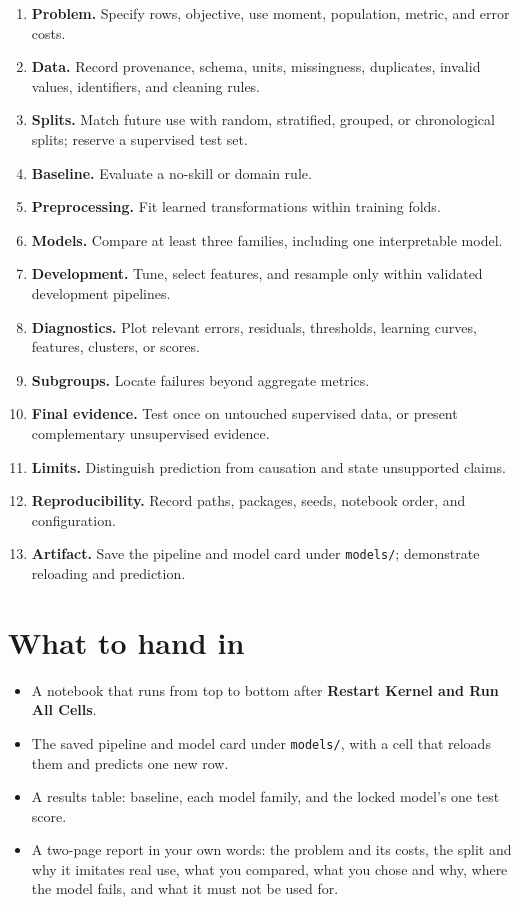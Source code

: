 \begin{enumerate}
  \item \textbf{Problem.} Specify rows, objective, use moment, population, metric, and error costs.
  \item \textbf{Data.} Record provenance, schema, units, missingness, duplicates, invalid values, identifiers, and cleaning rules.
  \item \textbf{Splits.} Match future use with random, stratified, grouped, or chronological splits; reserve a supervised test set.
  \item \textbf{Baseline.} Evaluate a no-skill or domain rule.
  \item \textbf{Preprocessing.} Fit learned transformations within training folds.
  \item \textbf{Models.} Compare at least three families, including one interpretable model.
  \item \textbf{Development.} Tune, select features, and resample only within validated development pipelines.
  \item \textbf{Diagnostics.} Plot relevant errors, residuals, thresholds, learning curves, features, clusters, or scores.
  \item \textbf{Subgroups.} Locate failures beyond aggregate metrics.
  \item \textbf{Final evidence.} Test once on untouched supervised data, or present complementary unsupervised evidence.
  \item \textbf{Limits.} Distinguish prediction from causation and state unsupported claims.
  \item \textbf{Reproducibility.} Record paths, packages, seeds, notebook order, and configuration.
  \item \textbf{Artifact.} Save the pipeline and model card under \texttt{models/}; demonstrate reloading and prediction.
\end{enumerate}

\section*{What to hand in}

\begin{itemize}
  \item A notebook that runs from top to bottom after \textbf{Restart Kernel and Run All Cells}.
  \item The saved pipeline and model card under \texttt{models/}, with a cell that reloads them and predicts one new row.
  \item A results table: baseline, each model family, and the locked model's one test score.
  \item A two-page report in your own words: the problem and its costs, the split and why it imitates real use, what you compared, what you chose and why, where the model fails, and what it must not be used for.
\end{itemize}

